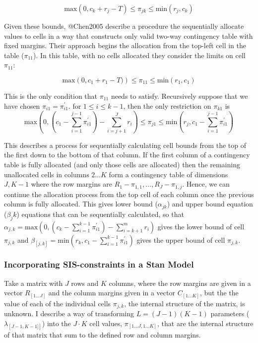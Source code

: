 \documentclass[
  letterpaper,
  DIV=11,
  numbers=noendperiod]{scrartcl}
\begin{document}
\[ \mathrm{max}\left(0, c_k + r_j - T \right) \le \pi_{jk} \le \mathrm{min} \left( r_j, c_k \right)\]

Given these bounds, @Chen2005 describe a procedure the sequentially
allocate values to cells in a way that constructs only valid two-way
contingency table with fixed margins. Their approach begins the
allocation from the top-left cell in the table (\(\pi_{11}\)). In this
table, with no cells allocated they consider the limits on cell
\(\pi_{11}\):

\[ \mathrm{max}\left(0, c_1 + r_1 - T )\right) \le \pi_{11} \le \mathrm{min} \left( r_1, c_1 \right)\]

This is the only condition that \(\pi_{11}\) needs to satisfy.
Recursively suppose that we have chosen \(\pi_{i1}= \pi^{\prime}_{i1}\).
for \(1 \le i \le k -1\), then the only restriction on \(\pi_{k1}\) is
\[ \mathrm{max}\left( 0, \left(c_1 - \sum_{i=1}^{j-1} \pi_{i1}^{\prime} \right) - \sum_{i=j+1}^{J} r_i\right) \le \pi_{j1} \le \mathrm{min}\left(r_j, c_1 - \sum_{i=1}^{j-1} \pi_{i1}^{\prime}\right)\]

This describes a process for sequentially calculating cell bounds from
the top of the first down to the bottom of that column. If the first
column of a contingency table is fully allocated (and only those cells
are allocated) then the remaining unallocated cells in columns
\(2 \dots K\) form a contingency table of dimensions \(J, K-1\) where
the row margins are \(R_1 - \pi_{1,1}, \dots, R_J - \pi_{1,j}\). Hence,
we can continue the allocation process from the top cell of each column
once the previous column is fully allocated. This gives lower bound
(\(\alpha_{jk}\)) and upper bound equation (\(\beta_jk\)) equations that
can be sequentially calculated, so that
\(\alpha_{j,k} = \mathrm{max}\left( 0, \left(c_k - \sum_{i=1}^{k-1} \pi_{i1}^{\prime} \right) - \sum_{i=k+1}^{m} r_i\right)\)
gives the lower bound of cell \(\pi_{j,k}\) and
\(\beta_{[j,k]} = \mathrm{min}\left(r_k, c_1 - \sum_{i=1}^{k-1} \pi_{i1}^{\prime}\right)\)
gives the upper bound of cell \(\pi_{j,k}\).

\subsubsection{Incorporating SIS-constraints in a Stan
Model}\label{incorporating-sis-constraints-in-a-stan-model}

Take a matrix with \(J\) rows and \(K\) columns, where the row margins
are given in a vector \(R_{[1 \dots J]}\) and the column margins given
in a vector \(C_{[1 \dots K]}\), but the the value of each of the
individual cells \(\pi_{j,k}\), the internal structure of the matrix, is
unknown. I describe a way of transforming \(L = (J-1)(K-1)\) parameters
(\(\lambda_{\left[J-1, K-1]\right]}\)) into the \(J \cdot K\) cell
values, \(\pi_{[1 \dots J,1 \dots K]}\), that are the internal structure
of that matrix that sum to the defined row and column margins.
\end{document}
